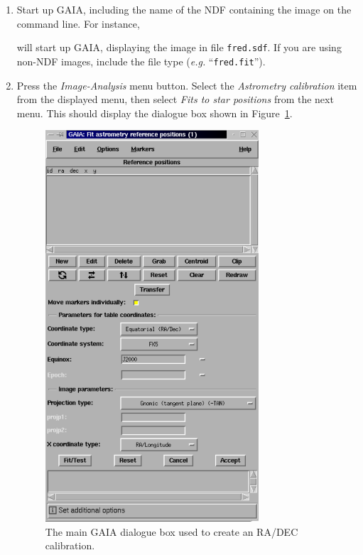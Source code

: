 \documentclass[twoside,11pt]{starlink}
\begin{document}
\begin{enumerate}

\item Start up GAIA, including the name of the NDF containing the image
on the command line. For instance,

\begin{terminalv}
\end{terminalv}

will start up GAIA, displaying the image in file \texttt{fred.sdf}. If you
are using non-NDF images, include the file type (\emph{e.g.} ``\texttt{fred.fit}'').

\item Press the \emph{Image-Analysis} menu button. Select the
\emph{Astrometry calibration} item from the displayed menu, then select
\emph{Fits to star positions} from the next menu. This should display the
dialogue box shown in Figure~\ref{fig:gaia1}.

  \begin{figure}[htb]
  \begin{center}
  \includegraphics[clip,width=0.75\textwidth]{sun223_figures/gaia1}
  \caption{The main GAIA dialogue box used to create an RA/DEC calibration.}
  \label{fig:gaia1}
  \end{center}
  \end{figure}


\end{enumerate}
\end{document}
